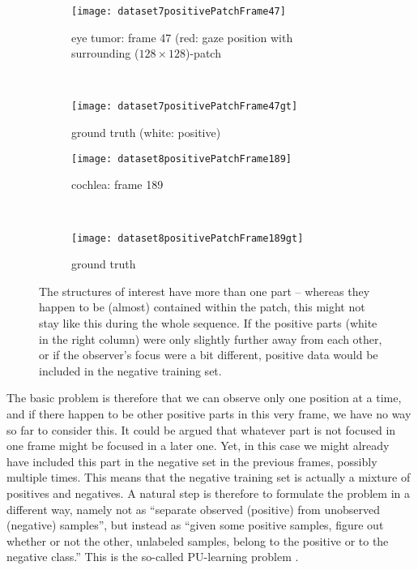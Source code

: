 \begin{figure}[ht]
	\centering
	\begin{subfigure}[h]{0.48\textwidth}
		\texttt{[image: dataset7positivePatchFrame47]}
		\caption*{eye tumor: frame 47 (red: gaze position with surrounding ($128\times128$)-patch}
	\end{subfigure}
	~
	\begin{subfigure}[h]{0.48\textwidth}
	    \texttt{[image: dataset7positivePatchFrame47gt]}
	    \caption*{ground truth (white: positive) \newline}
	\end{subfigure}
	
	\vspace{3mm}
	\begin{subfigure}[h]{0.48\textwidth}
		\texttt{[image: dataset8positivePatchFrame189]}	
		\caption*{cochlea: frame 189}
	\end{subfigure}
	~
	\begin{subfigure}[h]{0.48\textwidth}
		\texttt{[image: dataset8positivePatchFrame189gt]}	
		\caption*{ground truth}
	\end{subfigure}
	\caption{The structures of interest have more than one part -- whereas they happen to be (almost) contained within the patch, this might not stay like this during the whole sequence. If the positive parts (white in the right column) were only slightly further away from each other, or if the observer's focus were a bit different, positive data would be included in the negative training set.}
	\label{fig:nonValidAssumptionD78}
\end{figure}

The basic problem is therefore that we can observe only one position at a time, and if there happen to be other positive parts in this very frame, we have no way so far to consider this. 
It could be argued that whatever part is not focused in one frame might be focused in a later one. 
Yet, in this case we might already have included this part in the negative set in the previous frames, possibly multiple times. 
This means that the negative training set is actually a mixture of positives and negatives.
A natural step is therefore to formulate the problem in a different way, namely not as ``separate observed (positive) from unobserved (negative) samples'', but instead as ``given some positive samples, figure out whether or not the other, unlabeled samples, belong to the positive or to the negative class.'' This is the so-called PU-learning problem \cite{elkan2008learning}.

